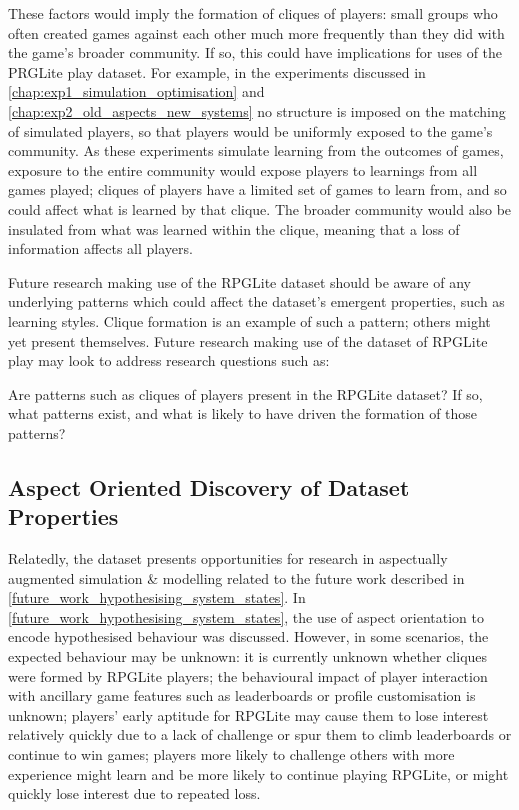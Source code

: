 These factors would imply the formation of cliques of players: small groups who
often created games against each other much more frequently than they did with
the game's broader community. If so, this could have implications for uses of
the PRGLite play dataset. For example, in the experiments discussed in
\cref{chap:exp1_simulation_optimisation} and
\cref{chap:exp2_old_aspects_new_systems} no structure is imposed on the matching
of simulated players, so that players would be uniformly exposed to the game's
community. As these experiments simulate learning from the outcomes of games,
exposure to the entire community would expose players to learnings from all
games played; cliques of players have a limited set of games to learn from, and
so could affect what is learned by that clique. The broader community would also
be insulated from what was learned within the clique, meaning that a loss of
information affects all players.

Future research making use of the RPGLite dataset should be aware of any
underlying patterns which could affect the dataset's emergent properties, such
as learning styles. Clique formation is an example of such a pattern; others
might yet present themselves. Future research making use of the dataset of
RPGLite play may look to address research questions such as:

\begin{researchquestion}
    Are patterns such as cliques of players present in the RPGLite dataset? If
    so, what patterns exist, and what is likely to have driven the formation of
    those patterns?
\end{researchquestion}


\subsection{Aspect Oriented Discovery of Dataset Properties}
\label{future_work_discovering_emergent_properties}

Relatedly, the dataset presents opportunities for research in aspectually
augmented simulation \& modelling related to the future work described in
\cref{future_work_hypothesising_system_states}. In
\cref{future_work_hypothesising_system_states}, the use of aspect orientation to
encode hypothesised behaviour was discussed. However, in some scenarios, the
expected behaviour may be unknown: it is currently unknown whether cliques were
formed by RPGLite players; the behavioural impact of player interaction with
ancillary game features such as leaderboards or profile customisation is
unknown; players' early aptitude for RPGLite may cause them to lose interest
relatively quickly due to a lack of challenge or spur them to climb leaderboards
or continue to win games; players more likely to challenge others with more
experience might learn and be more likely to continue playing RPGLite, or might
quickly lose interest due to repeated loss.

